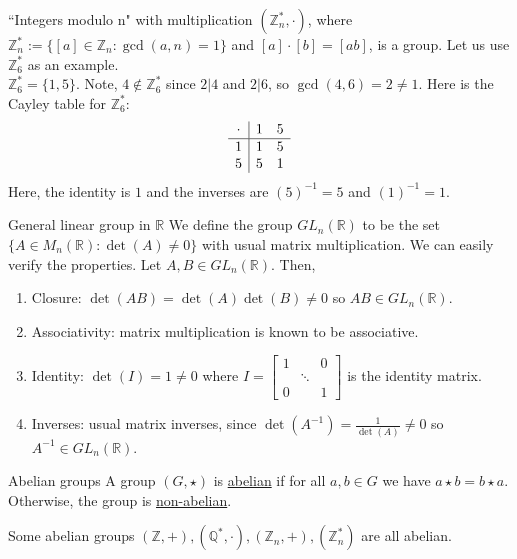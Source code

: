 \documentclass[12pt]{article}
\newcommand{\R}{\mathbb{R}}
\newcommand{\Z}{\mathbb{Z}}
\newcommand{\Q}{\mathbb{Q}}
\newcommand{\inv}{^{-1}}
\begin{document}
	\begin{myex}{``Integers modulo n" with multiplication}{}
		$(\Z_n^*, \cdot)$, where $\Z_n^*:=\{[a]\in\Z_n:\gcd(a, n)=1\}$ and $[a]\cdot[b]=[ab]$, is a group. Let us use $\Z_6^*$ as an example.\\
		
		$\Z_6^*=\{1, 5\}$. Note, $4\notin\Z_6^*$ since $2|4$ and $2|6$, so $\gcd(4, 6)=2\neq1$. Here is the Cayley table for $\Z_6^*$:
		\begin{align*}
			\begin{array}{c | cc}
			\cdot & 1 & 5 \\
			\hline
			1     & 1 & 5 \\
			5     & 5 & 1
			\end{array}
		\end{align*}
		Here, the identity is $1$ and the inverses are $(5)\inv=5$ and $(1)\inv=1$.
	\end{myex}
	
	\begin{myex}{General linear group in $\R$}{}
		We define the group $GL_n(\R)$ to be the set $\{A\in M_n(\R):\det(A)\neq0\}$ with usual matrix multiplication. We can easily verify the properties. Let $A, B\in GL_n(\R)$. Then,
		\begin{enumerate}[label=(\roman*)]
			\item Closure: $\det(AB)=\det(A)\det(B)\neq0$ so $AB\in GL_n(\R)$.
			\item Associativity: matrix multiplication is known to be associative.
			\item Identity: $\det(I)=1\neq0$ where $I=\begin{bmatrix}1&~&0\\~&\ddots\\0&~&1\end{bmatrix}$ is the identity matrix.
			\item Inverses: usual matrix inverses, since $\det(A\inv)=\frac{1}{\det(A)}\neq0$ so $A\inv\in GL_n(\R)$.
		\end{enumerate}
	\end{myex}
	
	\begin{mydef}{Abelian groups}{}
		A group $(G, \star)$ is \underline{abelian} if for all $a, b\in G$ we have $a\star b=b\star a$. Otherwise, the group is \underline{non-abelian}.	
	\end{mydef}
	
	\begin{myex}{Some abelian groups}{}
		$(\Z, +), (\Q^*, \cdot), (\Z_n, +), (\Z_n^*)$ are all abelian.
	\end{myex}
	
\end{document}
